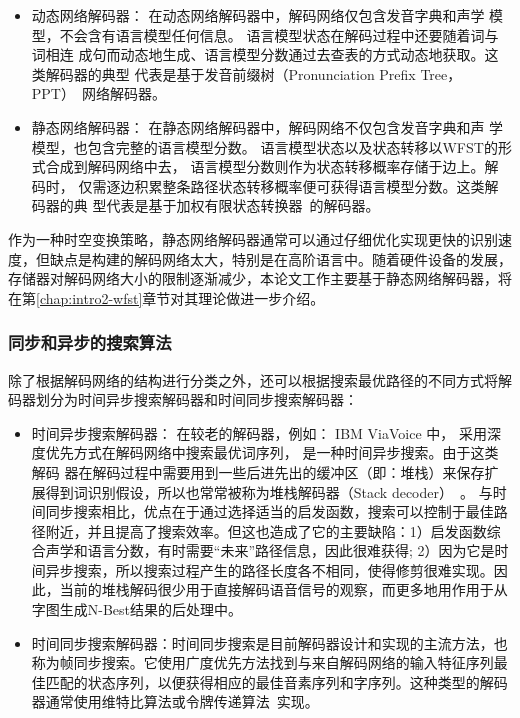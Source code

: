 \begin{itemize}
\item 动态网络解码器： 在动态网络解码器中，解码网络仅包含发音字典和声学
模型，不会含有语言模型任何信息。 语言模型状态在解码过程中还要随着词与词相连
成句而动态地生成、语言模型分数通过去查表的方式动态地获取。这类解码器的典型
代表是基于发音前缀树（Pronunciation Prefix Tree， PPT）~\cite{woodland1994large}网络解码器。
\item 静态网络解码器： 在静态网络解码器中，解码网络不仅包含发音字典和声
学模型，也包含完整的语言模型分数。 语言模型状态以及状态转移以WFST的形
式合成到解码网络中去， 语言模型分数则作为状态转移概率存储于边上。解码时，
仅需逐边积累整条路径状态转移概率便可获得语言模型分数。这类解码器的典
型代表是基于加权有限状态转换器~\cite{mohri2002weighted}的解码器。
\end{itemize}

作为一种时空变换策略，静态网络解码器通常可以通过仔细优化实现更快的识别速度，但缺点是构建的解码网络太大，特别是在高阶语言中。随着硬件设备的发展，存储器对解码网络大小的限制逐渐减少，本论文工作主要基于静态网络解码器，将在第\ref{chap:intro2-wfst}章节对其理论做进一步介绍。

\subsubsection{同步和异步的搜索算法}
\label{chap:intro-lvcsr-decmethod-search}

除了根据解码网络的结构进行分类之外，还可以根据搜索最优路径的不同方式将解码器划分为时间异步搜索解码器和时间同步搜索解码器：

\begin{itemize}
\item 时间异步搜索解码器： 在较老的解码器，例如： IBM ViaVoice 中， 采用深度优先方式在解码网络中搜索最优词序列， 是一种时间异步搜索。由于这类解码
器在解码过程中需要用到一些后进先出的缓冲区（即：堆栈）来保存扩展得到词识别假设，所以也常常被称为堆栈解码器（Stack decoder）~\cite{paul1992efficient}。 
与时间同步搜索相比，优点在于通过选择适当的启发函数，搜索可以控制于最佳路径附近，并且提高了搜索效率。但这也造成了它的主要缺陷：1）启发函数综合声学和语言分数，有时需要“未来”路径信息，因此很难获得; 2）因为它是时间异步搜索，所以搜索过程产生的路径长度各不相同，使得修剪很难实现。因此，当前的堆栈解码很少用于直接解码语音信号的观察，而更多地用作用于从字图生成N-Best结果的后处理中。
\item 时间同步搜索解码器：时间同步搜索是目前解码器设计和实现的主流方法，也称为帧同步搜索。它使用广度优先方法找到与来自解码网络的输入特征序列最佳匹配的状态序列，以便获得相应的最佳音素序列和字序列。这种类型的解码器通常使用维特比算法或令牌传递算法~\cite{woodland1994large}实现。 
\end{itemize}

